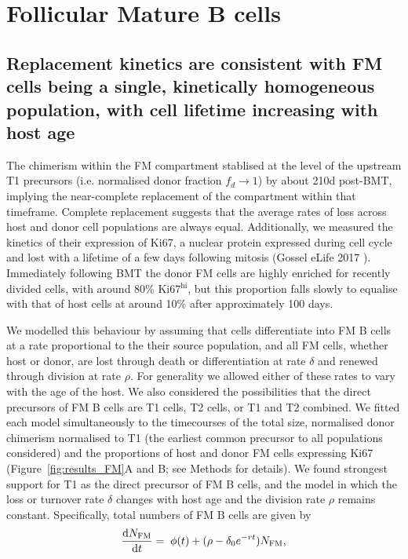 \documentclass[11pt]{article}
\newcommand{\ddt}[1]{\ensuremath{\frac{{\rm d}#1}{{\rm d}t}}}  %
\newcommand{\red}[1]{{\color{red}{#1}}}
\newcommand{\be}{\begin{equation}}
\newcommand{\ee}{\end{equation}}
\newcommand{\khi}{Ki67$^\text{hi}$}
\newcommand{\klo}{Ki67$^\text{lo}$}
\begin{document}
	\section*{Follicular Mature B cells}
	
	\subsection*{Replacement kinetics are consistent with FM cells being a single, kinetically homogeneous population, with cell lifetime increasing with host age}
	The chimerism within the FM compartment stablised at the level of the upstream T1 precursors (i.e. normalised donor fraction $f_{d} \rightarrow 1$) by about 210d post-BMT, implying the near-complete replacement of the compartment within that timeframe. Complete replacement suggests that the average rates of loss across host and donor cell populations are always equal.
	Additionally, we measured the kinetics of their expression of Ki67, a nuclear protein expressed during cell cycle and lost with a lifetime of a few days following mitosis (Gossel eLife 2017 \red{and others - see refs in that paper}). Immediately following BMT the donor FM cells are highly enriched for recently divided cells, with around 80\% \khi, but this proportion falls slowly to equalise with that of host cells at around 10\% after approximately 100 days. \red{This kinetic is consistent with IDEA HERE}
	
	
	We modelled this behaviour by assuming that cells differentiate into FM B cells at a rate proportional to the their source population, and all FM cells, whether host or donor, are lost through death or differentiation  at rate $\delta$ and renewed through division  at rate $\rho$. For generality we allowed either of these rates to vary with the age of the host. We also considered the possibilities that the direct precursors of FM B cells are T1 cells, T2 cells, or T1 and T2 combined. We fitted each model  simultaneously to the timecourses of the total size, normalised donor chimerism normalised to T1 (the earliest common precursor to all populations considered) and the proportions of host and donor FM cells expressing Ki67 (Figure~\ref{fig:results_FM}A and B; see Methods for details). We found strongest support for T1 as the direct precursor of FM B cells, and the model in which the loss or turnover rate $\delta$ changes with host age and the division rate $\rho$ remains constant. Specifically, total numbers of FM B cells are given by
	\be
	\ddt{N_\text{FM}} = \;  \phi(t) + (\rho - \delta_{0}e^{-rt}) N_\text{FM},
	\label{eq:FM_total}
	\ee
	
\end{document}
